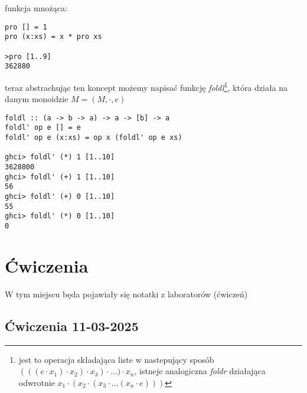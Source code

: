 \documentclass[11pt,a4paper]{article}
\begin{document}
funkcja mnożąca:
\begin{Verbatim}[frame=single]
pro [] = 1
pro (x:xs) = x * pro xs

>pro [1..9]
362880
\end{Verbatim}

teraz abstrachując ten koncept możemy napisać funkcję \textit{foldl}\footnote{jest to operacja składająca liste w nastepujący sposób $(((e \cdot x_1) \cdot x_2 ) \cdot x_3 ) \cdot \dots ) \cdot x_n$, istneje analogiczna \textit{foldr} działająca odwrotnie $x_1 \cdot (x_2 \cdot (x_3 \cdot \dots (x_n \cdot e)))$}, która działa na danym monoidzie $M=(M,\cdot,e)$
\begin{Verbatim}[frame=single]
foldl :: (a -> b -> a) -> a -> [b] -> a
foldl' op e [] = e
foldl' op e (x:xs) = op x (foldl' op e xs)

ghci> foldl' (*) 1 [1..10]
3628800
ghci> foldl' (+) 1 [1..10]
56
ghci> foldl' (+) 0 [1..10]
55
ghci> foldl' (*) 0 [1..10]
0
\end{Verbatim}
\section{Ćwiczenia}
W tym miejscu będa pojawiały się notatki z laboratorów (ćwiczeń)
\subsection{Ćwiczenia 11-03-2025}
\end{document}
